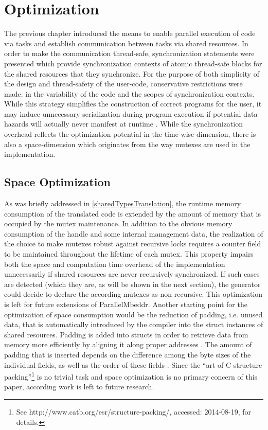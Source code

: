 \chapter{Optimization}
\label{optimization}
The previous chapter introduced the means to enable parallel execution of code via tasks and establish communication between tasks via shared resources. In order to make the communication thread-safe, synchronization statements were presented which provide synchronization contexts of atomic thread-safe blocks for the shared resources that they synchronize. For the purpose of both simplicity of the design and thread-safety of the user-code, conservative restrictions were made: in the variability of the code and the scopes of synchronization contexts. While this strategy simplifies the construction of correct programs for the user, it may induce unnecessary serialization during program execution if potential data hazards will actually never manifest at runtime \cite{SpeculativeLockElision}. While the synchronization overhead reflects the optimization potential in the time-wise dimension, there is also a space-dimension which originates from the way mutexes are used in the implementation. 

\section{Space Optimization}
As was briefly addressed in \ref{sharedTypesTranslation}, the runtime memory consumption of the translated code is extended by the amount of memory that is occupied by the mutex maintenance. In addition to the obvious memory consumption of the handle and some internal management data, the realization of the choice to make mutexes robust against recursive locks requires a counter field to be maintained throughout the lifetime of each mutex. This property impairs both the space and computation time overhead of the implementation unnecessarily if shared resources are never recursively synchronized. If such cases are detected (which they are, as will be shown in the next section), the generator could decide to declare the according mutexes as non-recursive. This optimization is left for future extensions of ParallelMbeddr. Another starting point for the optimization of space consumption would be the reduction of padding, i.e. unused data, that is automatically introduced by the compiler into the struct instances of shared resources. Padding is added into structs in order to retrieve data from memory more efficiently by aligning it along proper addresses \cite[p.~27]{MemoryAsAProgrammingConcept}. The amount of padding that is inserted depends on the difference among the byte sizes of the individual fields, as well as the order of these fields \cite{MemoryAsAProgrammingConcept}. Since the ``art of C structure packing''\footnote{See http://www.catb.org/esr/structure-packing/, accessed: 2014-08-19, for details.} is no trivial task and space optimization is no primary concern of this paper, according work is left to future research.



